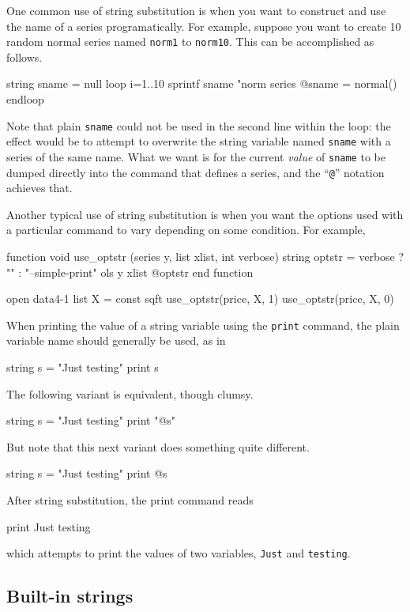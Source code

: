 One common use of string substitution is when you want to construct
and use the name of a series programatically. For example, suppose you
want to create 10 random normal series named \texttt{norm1} to
\texttt{norm10}. This can be accomplished as follows.
%
\begin{code}
string sname = null
loop i=1..10
  sprintf sname "norm%
  series @sname = normal()
endloop
\end{code}
%
Note that plain \texttt{sname} could not be used in the second line
within the loop: the effect would be to attempt to overwrite the
string variable named \texttt{sname} with a series of the same
name. What we want is for the current \textit{value} of
\texttt{sname} to be dumped directly into the command that defines a
series, and the ``\verb|@|'' notation achieves that.

Another typical use of string substitution is when you want the
options used with a particular command to vary depending on
some condition. For example,
%
\begin{code}
function void use_optstr (series y, list xlist, int verbose)
   string optstr = verbose ? "" : "--simple-print"
   ols y xlist @optstr 
end function

open data4-1
list X = const sqft
use_optstr(price, X, 1)
use_optstr(price, X, 0)
\end{code} 

When printing the value of a string variable using the \texttt{print}
command, the plain variable name should generally be used, as in
%
\begin{code}
string s = "Just testing"
print s
\end{code}
%
The following variant is equivalent, though clumsy.
%
\begin{code}
string s = "Just testing"
print "@s"
\end{code}
%
But note that this next variant does something quite different.
%
\begin{code}
string s = "Just testing"
print @s
\end{code}
%
After string substitution, the print command reads
%
\begin{code}
print Just testing
\end{code}
%
which attempts to print the values of two variables, \texttt{Just} and
\texttt{testing}.

\subsection{Built-in strings}

